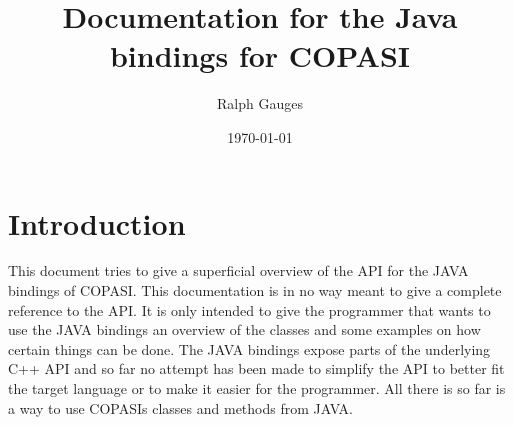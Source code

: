 \documentclass[a4,10pt]{article}
\begin{document}


%

\title{Documentation for the Java bindings for COPASI}
\author{Ralph Gauges}
\date{\today}
\maketitle
\parindent=0cm
\section{Introduction}
This document tries to give a superficial overview of the API for the JAVA bindings of COPASI. This documentation is in no way meant to give a complete reference to the API. It is only intended to give the programmer that wants to use the JAVA bindings an overview of the classes and some examples on how certain things can be done.
The JAVA bindings expose parts of the underlying C++ API and so far no attempt has been made to simplify the API to better fit the target language or to make it easier for the programmer. All there is so far is a way to use COPASIs classes and methods from JAVA.
\end{document}
